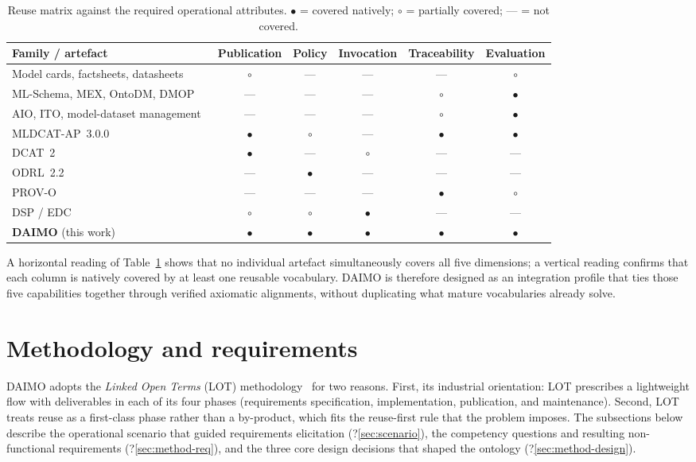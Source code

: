 \documentclass[Afour,sagev,times]{sagej}
\begin{document}
\begin{table}[tb]
\small\sf\centering
\caption{Reuse matrix against the required operational attributes. $\bullet$ = covered natively; $\circ$ = partially covered; --- = not covered.\label{tab:reuse-matrix}}
\begin{tabular}{@{}lccccc@{}}
\toprule
\textbf{Family / artefact} & \textbf{Publication} & \textbf{Policy} & \textbf{Invocation} & \textbf{Traceability} & \textbf{Evaluation} \\
\midrule
Model cards, factsheets, datasheets~\cite{mitchell19,arnold19,gebru21} & $\circ$ & --- & --- & --- & $\circ$ \\
ML-Schema, MEX, OntoDM, DMOP~\cite{mls,mex,ontodm,dmop} & --- & --- & --- & $\circ$ & $\bullet$ \\
AIO, ITO, model-dataset management~\cite{aio,ito,novacek24} & --- & --- & --- & $\circ$ & $\bullet$ \\
MLDCAT-AP~3.0.0~\cite{mldcatap} & $\bullet$ & $\circ$ & --- & $\bullet$ & $\bullet$ \\
DCAT~2~\cite{dcat2} & $\bullet$ & --- & $\circ$ & --- & --- \\
ODRL~2.2~\cite{odrl22} & --- & $\bullet$ & --- & --- & --- \\
PROV-O~\cite{provo} & --- & --- & --- & $\bullet$ & $\circ$ \\
DSP / EDC~\cite{dsp,edc} & $\circ$ & $\circ$ & $\bullet$ & --- & --- \\
\midrule
\textbf{DAIMO} (this work) & $\bullet$ & $\bullet$ & $\bullet$ & $\bullet$ & $\bullet$ \\
\bottomrule
\end{tabular}
\end{table}

A horizontal reading of Table~\ref{tab:reuse-matrix} shows that no individual artefact simultaneously covers all five dimensions; a vertical reading confirms that each column is natively covered by at least one reusable vocabulary. DAIMO is therefore designed as an integration profile that ties those five capabilities together through verified axiomatic alignments, without duplicating what mature vocabularies already solve.

\section{Methodology and requirements}\label{sec:method}

DAIMO adopts the \emph{Linked Open Terms} (LOT) methodology~\cite{lot22} for two reasons. First, its industrial orientation: LOT prescribes a lightweight flow with deliverables in each of its four phases (requirements specification, implementation, publication, and maintenance). Second, LOT treats reuse as a first-class phase rather than a by-product, which fits the reuse-first rule that the problem imposes. The subsections below describe the operational scenario that guided requirements elicitation (?\ref{sec:scenario}), the competency questions and resulting non-functional requirements (?\ref{sec:method-req}), and the three core design decisions that shaped the ontology (?\ref{sec:method-design}).
\end{document}
